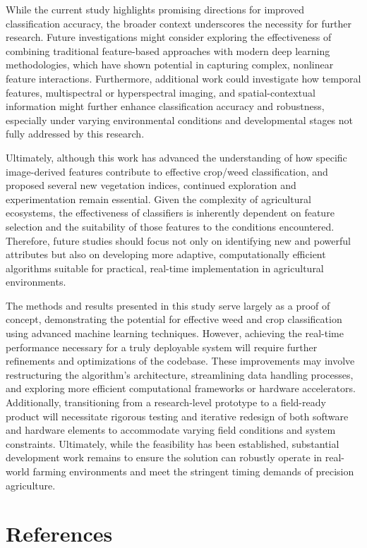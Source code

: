 \documentclass[letterpaper, notitlepage]{report}
\begin{document}
While the current study highlights promising directions for improved classification accuracy, the broader context underscores the necessity for further research. Future investigations might consider exploring the effectiveness of combining traditional feature-based approaches with modern deep learning methodologies, which have shown potential in capturing complex, nonlinear feature interactions. Furthermore, additional work could investigate how temporal features, multispectral or hyperspectral imaging, and spatial-contextual information might further enhance classification accuracy and robustness, especially under varying environmental conditions and developmental stages not fully addressed by this research.

Ultimately, although this work has advanced the understanding of how specific image-derived features contribute to effective crop/weed classification, and proposed several new vegetation indices, continued exploration and experimentation remain essential. Given the complexity of agricultural ecosystems, the effectiveness of classifiers is inherently dependent on feature selection and the suitability of those features to the conditions encountered. Therefore, future studies should focus not only on identifying new and powerful attributes but also on developing more adaptive, computationally efficient algorithms suitable for practical, real-time implementation in agricultural environments.

The methods and results presented in this study serve largely as a proof of concept, demonstrating the potential for effective weed and crop classification using advanced machine learning techniques. However, achieving the real-time performance necessary for a truly deployable system will require further refinements and optimizations of the codebase. These improvements may involve restructuring the algorithm’s architecture, streamlining data handling processes, and exploring more efficient computational frameworks or hardware accelerators. Additionally, transitioning from a research-level prototype to a field-ready product will necessitate rigorous testing and iterative redesign of both software and hardware elements to accommodate varying field conditions and system constraints. Ultimately, while the feasibility has been established, substantial development work remains to ensure the solution can robustly operate in real-world farming environments and meet the stringent timing demands of precision agriculture.

\chapter*{References}
\printbibliography[heading=none]
\appendix
\end{document}
